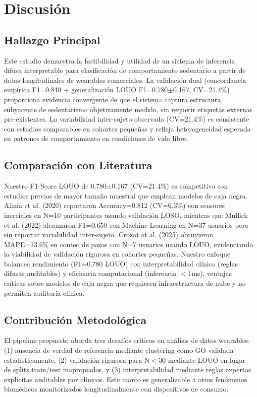 \documentclass[journal,twoside,web]{ieeecolor}
\begin{document}
\section{Discusión}

\subsection{Hallazgo Principal}
Este estudio demuestra la factibilidad y utilidad de un sistema de inferencia difusa interpretable para clasificación de comportamiento sedentario a partir de datos longitudinales de wearables comerciales. La validación dual (concordancia empírica F1=0.840 + generalización LOUO F1=0.780$\pm$0.167, CV=21.4\%) proporciona evidencia convergente de que el sistema captura estructura subyacente de sedentarismo objetivamente medido, sin requerir etiquetas externas pre-existentes. La variabilidad inter-sujeto observada (CV=21.4\%) es consistente con estudios comparables en cohortes pequeñas y refleja heterogeneidad esperada en patrones de comportamiento en condiciones de vida libre.

\subsection{Comparación con Literatura}
Nuestro F1-Score LOUO de 0.780$\pm$0.167 (CV=21.4\%) es competitivo con estudios previos de mayor tamaño muestral que emplean modelos de caja negra. Alinia et al. (2020) reportaron Accuracy=0.812 (CV=6.3\%) con sensores inerciales en N=10 participantes usando validación LOSO, mientras que Mullick et al. (2022) alcanzaron F1=0.650 con Machine Learning en N=37 usuarios pero sin reportar variabilidad inter-sujeto. Crozat et al. (2025) obtuvieron MAPE=13.6\% en conteo de pasos con N=7 usuarios usando LOUO, evidenciando la viabilidad de validación rigurosa en cohortes pequeñas. Nuestro enfoque balancea rendimiento (F1=0.780 LOUO) con interpretabilidad clínica (reglas difusas auditables) y eficiencia computacional (inferencia $<$1ms), ventajas críticas sobre modelos de caja negra que requieren infraestructura de nube y no permiten auditoría clínica.

\subsection{Contribución Metodológica}
El pipeline propuesto aborda tres desafíos críticos en análisis de datos wearables: (1) ausencia de verdad de referencia mediante clustering como GO validada estadísticamente, (2) validación rigurosa para N$<$30 mediante LOUO en lugar de splits train/test inapropiados, y (3) interpretabilidad mediante reglas expertas explícitas auditables por clínicos. Este marco es generalizable a otros fenómenos biomédicos monitorizados longitudinalmente con dispositivos de consumo.
\end{document}
